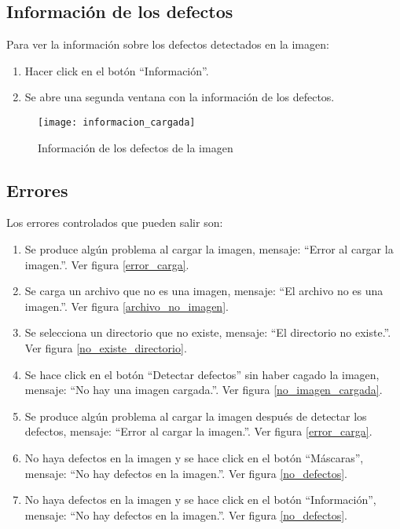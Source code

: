 
\subsection{Información de los defectos}

Para ver la información sobre los defectos detectados en la imagen:

\begin{enumerate}
    \item Hacer click en el botón ``Información''.
    \item Se abre una segunda ventana con la información de los defectos.
\end{enumerate}


\begin{figure}[htb]
	\centering
	\texttt{[image: informacion\_cargada]}
	\caption{Información de los defectos de la imagen}
	\label{informacion_cargada}
\end{figure}

\newpage

\subsection{Errores}

Los errores controlados que pueden salir son:

\begin{enumerate}
    \item Se produce algún problema al cargar la imagen, mensaje: ``Error al cargar la imagen.''. Ver figura \ref{error_carga}.
    \item Se carga un archivo que no es una imagen, mensaje: ``El archivo no es una imagen.''. Ver figura \ref{archivo_no_imagen}.
    \item Se selecciona un directorio que no existe, mensaje: ``El directorio no existe.''. Ver figura \ref{no_existe_directorio}.
    \item Se hace click en el botón ``Detectar defectos'' sin haber cagado la imagen, mensaje: ``No hay una imagen cargada.''. Ver figura \ref{no_imagen_cargada}.
    \item Se produce algún problema al cargar la imagen después de detectar los defectos, mensaje: ``Error al cargar la imagen.''. Ver figura \ref{error_carga}.
    \item No haya defectos en la imagen y se hace click en el botón ``Máscaras'', mensaje: ``No hay defectos en la imagen.''. Ver figura \ref{no_defectos}.
    \item No haya defectos en la imagen y se hace click en el botón ``Información'', mensaje: ``No hay defectos en la imagen.''. Ver figura \ref{no_defectos}.
\end{enumerate}

